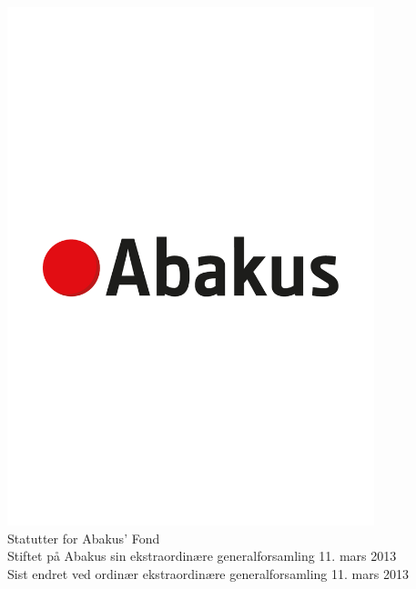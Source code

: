 \documentclass{article}
\begin{document}
\begin{center}
  \includegraphics[width=0.8\textwidth, trim=0 300 0 100, clip]{abakus_logo.eps} \\
  \Large{Statutter for Abakus' Fond} \\
  \vspace{0.4cm}
  \normalsize{Stiftet på Abakus sin ekstraordinære generalforsamling 11. mars 2013 \\
              Sist endret ved ordinær ekstraordinære generalforsamling 11. mars 2013}
\end{center}

\newpage
\tableofcontents


\end{document}
